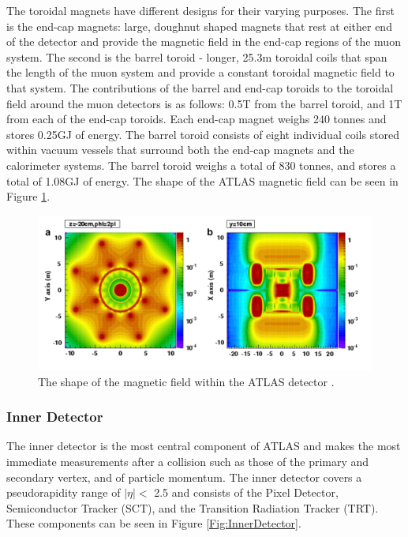 \documentclass[12pt,a4paper,epsf,portrait,times,epsfig]{article}
\begin{document}
		The toroidal magnets have different designs for their varying purposes. The first is the end-cap magnets: large, doughnut shaped magnets that rest at either end of the detector and provide the magnetic field in the end-cap regions of the muon system. The second is the barrel toroid - longer, 25.3m toroidal coils that span the length of the muon system
		and provide a constant toroidal magnetic field to that system. The contributions of the barrel and end-cap toroids to the toroidal field around the muon detectors is as follows: 0.5T from the barrel toroid, and 1T from each of the end-cap toroids. Each end-cap magnet weighs 240 tonnes and stores 0.25GJ of energy. The barrel toroid consists of eight
		individual coils stored within vacuum vessels that surround both the end-cap magnets and the calorimeter systems. The barrel toroid weighs a total of 830 tonnes, and stores a total of 1.08GJ of energy. The shape of the ATLAS magnetic field can be seen in Figure \ref{Fig:CernMagneticField}. 
		\cite{ATLAS-TDR-01, ATLAS-TDR-02, Article:ATLASDesignPaper}
		
		\begin{figure}
			\centering
			\includegraphics[scale=0.4]{Magnetic_Field}
			\caption{The shape of the magnetic field within the ATLAS detector \cite{Article:CernMagnets}. }
			\label{Fig:CernMagneticField}
		\end{figure}
		
		\subsubsection{Inner Detector}
		
		The inner detector is the most central component of ATLAS and makes the most immediate measurements after a collision such as those of the primary and secondary vertex, and of particle momentum. The inner detector covers a pseudorapidity range of $|\eta| <$ 2.5	and consists of the Pixel Detector, Semiconductor Tracker (SCT), and the Transition
		Radiation Tracker (TRT). These components can be seen in Figure \ref{Fig:InnerDetector}. \par
		
\end{document}
